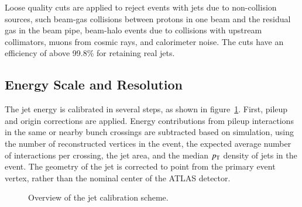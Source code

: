 Loose quality cuts are applied to reject events with jets due to non-collision sources, such beam-gas collisions between protons in one beam and the residual gas in the beam pipe, beam-halo events due to collisions with upstream collimators, muons from cosmic rays, and calorimeter noise. The cuts have an efficiency of above 99.8\% for retaining real jets. 


\subsection{Energy Scale and Resolution}
The jet energy is calibrated in several steps, as shown in figure~\ref{fig:reco-jet-calibration-flowchart}. First, pileup and origin corrections are applied. Energy contributions from pileup interactions in the same or nearby bunch crossings are subtracted based on simulation, using the number of reconstructed vertices in the event, the expected average number of interactions per crossing, the jet area, and the median $p_{\text{T}}$ density of jets in the event. The geometry of the jet is corrected to point from the primary event vertex, rather than the nominal center of the ATLAS detector. 

\begin{figure}[htbp]
	\centering
	\caption{Overview of the jet calibration scheme. }
	\label{fig:reco-jet-calibration-flowchart}
\end{figure}


